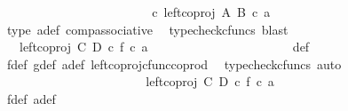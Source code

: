 \begin{isabellebody}
\ \ \ \ \ \ \ \ \ \ \ \ \ \ \ \ \ \ \isamarkupfalse%
\ \isamarkupfalse%
\ {\isachardoublequoteopen}{\isachardot}{\kern0pt}{\isachardot}{\kern0pt}{\isachardot}{\kern0pt}\ {\isacharequal}{\kern0pt}\ {\isacharparenleft}{\kern0pt}{\isasymphi}\ {\isasymcirc}\isactrlsub c\ left{\isacharunderscore}{\kern0pt}coproj\ A\ B{\isacharparenright}{\kern0pt}\ {\isasymcirc}\isactrlsub c\ a{\isacharprime}{\kern0pt}{\isachardoublequoteclose}\isanewline
\ \ \ \ \ \ \ \ \ \ \ \ \ \ \ \ \ \ \ \ \isamarkupfalse%
\ {\isasymphi}{\isacharunderscore}{\kern0pt}type\ a{\isacharprime}{\kern0pt}{\isacharunderscore}{\kern0pt}def\ comp{\isacharunderscore}{\kern0pt}associative{}\ \isamarkupfalse%
\ {\isacharparenleft}{\kern0pt}typecheck{\isacharunderscore}{\kern0pt}cfuncs{\isacharcomma}{\kern0pt}\ blast{\isacharparenright}{\kern0pt}\isanewline
\ \ \ \ \ \ \ \ \ \ \ \ \ \ \ \ \ \ \isamarkupfalse%
\ \isamarkupfalse%
\ {\isachardoublequoteopen}{\isachardot}{\kern0pt}{\isachardot}{\kern0pt}{\isachardot}{\kern0pt}\ {\isacharequal}{\kern0pt}\ {\isacharparenleft}{\kern0pt}left{\isacharunderscore}{\kern0pt}coproj\ C\ D\ {\isasymcirc}\isactrlsub c\ f{\isacharparenright}{\kern0pt}\ {\isasymcirc}\isactrlsub c\ a{\isacharprime}{\kern0pt}\ {\isachardoublequoteclose}\isanewline
\ \ \ \ \ \ \ \ \ \ \ \ \ \ \ \ \ \ \ \ \isamarkupfalse%
\ {\isasymphi}{\isacharunderscore}{\kern0pt}def\ \isamarkupfalse%
\ f{\isacharunderscore}{\kern0pt}def\ g{\isacharunderscore}{\kern0pt}def\ a{\isacharprime}{\kern0pt}{\isacharunderscore}{\kern0pt}def\ left{\isacharunderscore}{\kern0pt}coproj{\isacharunderscore}{\kern0pt}cfunc{\isacharunderscore}{\kern0pt}coprod\ \isamarkupfalse%
\ {\isacharparenleft}{\kern0pt}typecheck{\isacharunderscore}{\kern0pt}cfuncs{\isacharcomma}{\kern0pt}\ auto{\isacharparenright}{\kern0pt}\isanewline
\ \ \ \ \ \ \ \ \ \ \ \ \ \ \ \ \ \ \isamarkupfalse%
\ \isamarkupfalse%
\ {\isachardoublequoteopen}{\isachardot}{\kern0pt}{\isachardot}{\kern0pt}{\isachardot}{\kern0pt}\ {\isacharequal}{\kern0pt}\ left{\isacharunderscore}{\kern0pt}coproj\ C\ D\ {\isasymcirc}\isactrlsub c\ {\isacharparenleft}{\kern0pt}f\ {\isasymcirc}\isactrlsub c\ a{\isacharprime}{\kern0pt}{\isacharparenright}{\kern0pt}{\isachardoublequoteclose}\isanewline
\ \ \ \ \ \ \ \ \ \ \ \ \ \ \ \ \ \ \ \ \ \ \isamarkupfalse%
\ f{\isacharunderscore}{\kern0pt}def\ a{\isacharprime}{\kern0pt}{\isacharunderscore}{\kern0pt}def\ \isamarkupfalse%

\end{isabellebody}
